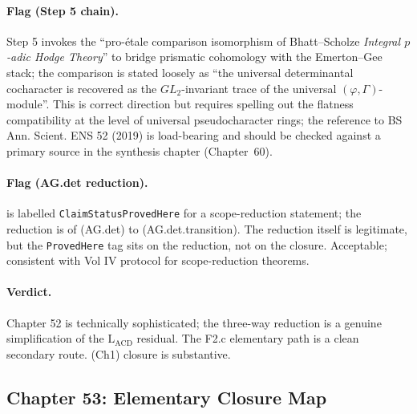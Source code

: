 \paragraph{Flag (Step 5 chain).}
 Step 5 invokes the
``pro-\'etale comparison isomorphism of Bhatt--Scholze \emph{Integral
\(p\)-adic Hodge Theory}'' to bridge prismatic cohomology with the
Emerton--Gee stack; the comparison is stated loosely as ``the
universal determinantal cocharacter is recovered as the
\(GL_{2}\)-invariant trace of the universal
\((\varphi,\Gamma)\)-module''. This is correct direction but
requires spelling out the flatness compatibility at the level of
universal pseudocharacter rings; the reference to BS Ann. Scient.
ENS 52 (2019) is load-bearing and should be checked against a
primary source in the synthesis chapter (Chapter~60).

\paragraph{Flag (AG.det reduction).}
 is labelled
\texttt{ClaimStatusProvedHere} for a scope-reduction statement; the
reduction is of (AG.det) to (AG.det.transition). The reduction
itself is legitimate, but the \texttt{ProvedHere} tag sits on
the reduction, not on the closure. Acceptable; consistent with Vol
IV protocol for scope-reduction theorems.

\paragraph{Verdict.} Chapter 52 is technically sophisticated; the
three-way reduction is a genuine simplification of the
\(\mathrm{L}_{\mathrm{ACD}}\) residual. The F2.c elementary path is a
clean secondary route. (Ch1) closure is substantive.

\subsection{Chapter 53: Elementary Closure Map}
\label{v4-arith:w6-j:ch53}

